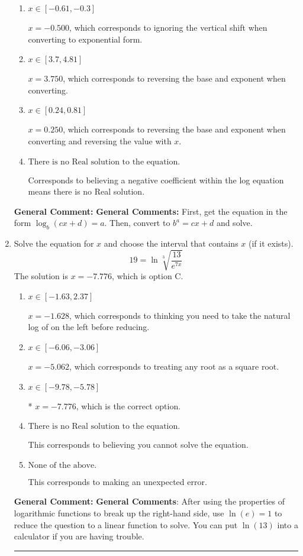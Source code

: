 \documentclass{extbook}[14pt]
\newcommand{\litem}[1]{\item #1

\rule{\textwidth}{0.4pt}}
\begin{document}
\begin{enumerate}
{\begin{enumerate}[label=\Alph*.]
* $x = 1.722$, which is the correct option.
\item \( x \in [-0.61, -0.3] \)

$x = -0.500$, which corresponds to ignoring the vertical shift when converting to exponential form.
\item \( x \in [3.7, 4.81] \)

$x = 3.750$, which corresponds to reversing the base and exponent when converting.
\item \( x \in [0.24, 0.81] \)

$x = 0.250$, which corresponds to reversing the base and exponent when converting and reversing the value with $x$.
\item \( \text{There is no Real solution to the equation.} \)

Corresponds to believing a negative coefficient within the log equation means there is no Real solution.
\end{enumerate}

\textbf{General Comment:} \textbf{General Comments:} First, get the equation in the form $\log_b{(cx+d)} = a$. Then, convert to $b^a = cx+d$ and solve.
}
\litem{
 Solve the equation for $x$ and choose the interval that contains $x$ (if it exists).
\[  19 = \ln{\sqrt[3]{\frac{13}{e^{7x}}}} \]The solution is \( x = -7.776 \), which is option C.\begin{enumerate}[label=\Alph*.]
\item \( x \in [-1.63, 2.37] \)

$x = -1.628$, which corresponds to thinking you need to take the natural log of on the left before reducing.
\item \( x \in [-6.06, -3.06] \)

$x = -5.062$, which corresponds to treating any root as a square root.
\item \( x \in [-9.78, -5.78] \)

* $x = -7.776$, which is the correct option.
\item \( \text{There is no Real solution to the equation.} \)

This corresponds to believing you cannot solve the equation.
\item \( \text{None of the above.} \)

This corresponds to making an unexpected error.
\end{enumerate}

\textbf{General Comment:} \textbf{General Comments}: After using the properties of logarithmic functions to break up the right-hand side, use $\ln(e) = 1$ to reduce the question to a linear function to solve. You can put $\ln(13)$ into a calculator if you are having trouble.
}
\end{enumerate}
\end{document}
